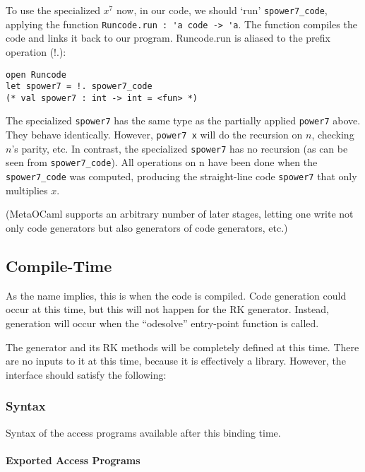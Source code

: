 \documentclass[12pt, titlepage]{article}
\begin{document}
To use the specialized $x^7$ now, in our code, we should `run' 
\lstinline|spower7_code|, applying the function 
\lstinline|Runcode.run : 'a code -> 'a|. The function compiles the code and 
links it back to our program. Runcode.run is aliased to the prefix operation 
(!.):
\begin{lstlisting}
open Runcode
let spower7 = !. spower7_code
(* val spower7 : int -> int = <fun> *)
\end{lstlisting}

The specialized \lstinline|spower7| has the same type as the partially applied 
\lstinline|power7| above. They behave identically. However, 
\lstinline|power7 x| will do the recursion on $n$, checking $n$'s parity, etc. 
In contrast, the specialized \lstinline|spower7| has no recursion (as can be 
seen from \lstinline|spower7_code|). All operations on n have been done when 
the \lstinline|spower7_code| was computed, producing the straight-line code 
\lstinline|spower7| that only multiplies $x$.

(MetaOCaml supports an arbitrary number of later stages, letting one write not 
only code generators but also generators of code generators, etc.)

\subsection{Compile-Time}
As the name implies, this is when the code is compiled. Code generation could 
occur at this time, but this will not happen for the RK generator. Instead, 
generation will occur when the ``odesolve'' entry-point function is called.

The generator and its RK methods will be completely defined at this time. There 
are no inputs to it at this time, because it is effectively a library. However, 
the interface should satisfy the following:

\subsubsection{Syntax}
Syntax of the access programs available after this binding time.

\paragraph{Exported Access Programs}
\end{document}
